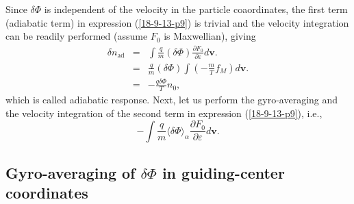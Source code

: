 \documentclass{article}
\newcommand{\tmop}[1]{\ensuremath{\operatorname{#1}}}
\begin{document}
Since $\delta \Phi$ is independent of the velocity in the particle
coaordinates, the first term (adiabatic term) in expression (\ref{18-9-13-p9})
is trivial and the velocity integration can be readily performed (assume $F_0$
is Maxwellian), giving
\begin{eqnarray}
  \delta n_{\tmop{ad}} & = & \int \frac{q}{m} (\delta \Phi) \frac{\partial
  F_0}{\partial \varepsilon} d\mathbf{v}. \nonumber\\
  & = & \frac{q}{m} (\delta \Phi) \int \left( - \frac{m}{T} f_M \right)
  d\mathbf{v}. \nonumber\\
  & = & - \frac{q \delta \Phi}{T} n_0,  \label{18-11-27-1}
\end{eqnarray}
which is called adiabatic response. Next, let us perform the gyro-averaging
and the velocity integration of the second term in expression
(\ref{18-9-13-p9}), i.e.,
\begin{equation}
  \label{21-9-18-a1} - \int \frac{q }{m} \langle \delta \Phi \rangle_{\alpha}
  \frac{\partial F_0}{\partial \varepsilon} d\mathbf{v}.
\end{equation}

\subsection{Gyro-averaging of $\delta \Phi$ in guiding-center coordinates}
\end{document}
